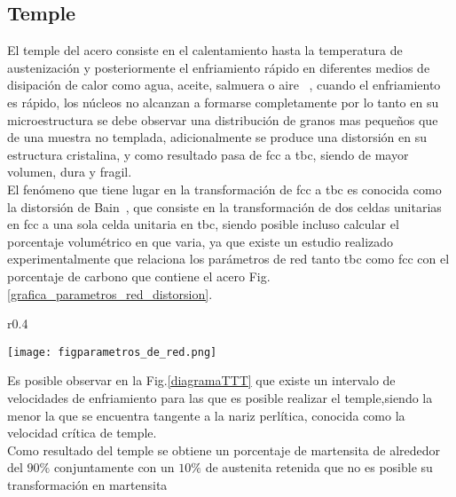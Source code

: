\documentclass[a4paper, 9pt]{article}
\begin{document}
\subsection{Temple}
El temple del acero consiste en el calentamiento hasta la temperatura de austenización y posteriormente el enfriamiento rápido en diferentes medios de disipación de calor como agua, aceite, salmuera o aire ~\cite{libro_guia}, cuando el enfriamiento es rápido, los núcleos no alcanzan a formarse completamente por lo tanto en su microestructura se debe observar una distribución de granos mas pequeños que de una muestra no templada, adicionalmente se produce una distorsión en su estructura cristalina, y como resultado pasa de fcc a tbc, siendo de mayor volumen, dura y fragil.
\\
El fenómeno que tiene lugar en la transformación de fcc a tbc es conocida como la distorsión de Bain~\cite{distorsion_bain}, que consiste en la transformación de dos celdas unitarias en fcc a una sola celda unitaria en tbc, siendo posible incluso calcular el porcentaje volumétrico en que varia, ya que existe  un estudio realizado experimentalmente que relaciona los parámetros de red tanto tbc como fcc con el porcentaje de carbono que contiene el acero Fig.\ref{grafica_parametros_red_distorsion}.
\\
\begin{wrapfigure}[12]{r}{0.4\textwidth} 
\vspace{-0.4cm}
\begin{center}
    \texttt{[image: figparametros\_de\_red.png]}
    \vspace{-0.2cm}
     \caption{Variación de parámetros de red Vs. porcentaje de carbono}
    \label{grafica_parametros_red_distorsion}
\end{center}
\end{wrapfigure}
 
Es posible observar en la Fig.\ref{diagramaTTT} que existe un intervalo de velocidades de enfriamiento para las que es posible realizar el temple,siendo la menor la que se encuentra tangente a la nariz perlítica, conocida como la velocidad crítica de temple.
\\
Como resultado del temple se obtiene un porcentaje de martensita de alrededor del $90\%$ conjuntamente con un $10\%$ de austenita retenida que no es posible su transformación en martensita
\end{document}
